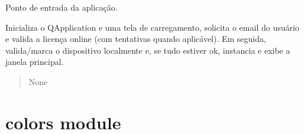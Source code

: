 \documentclass[letterpaper,10pt,english]{sphinxmanual}
\begin{document}

\begin{fulllineitems}
\label{\detokenize{api/app:app.main}}
\pysigstartsignatures
\pysiglinewithargsret
{}
{}
{}
\pysigstopsignatures
\sphinxAtStartPar
Ponto de entrada da aplicação.

\sphinxAtStartPar
Inicializa o QApplication e uma tela de carregamento, solicita o e\sphinxhyphen{}mail do
usuário e valida a licença online (com tentativas quando aplicável). Em
seguida, valida/marca o dispositivo localmente e, se tudo estiver ok,
instancia e exibe a janela principal.
\begin{quote}\begin{description}
\sphinxAtStartPar
{}

\sphinxAtStartPar
None

\end{description}\end{quote}

\end{fulllineitems}


\sphinxstepscope


\section{colors module}
\label{\detokenize{api/colors:module-colors}}\label{\detokenize{api/colors:colors-module}}\label{\detokenize{api/colors::doc}}
\end{document}
